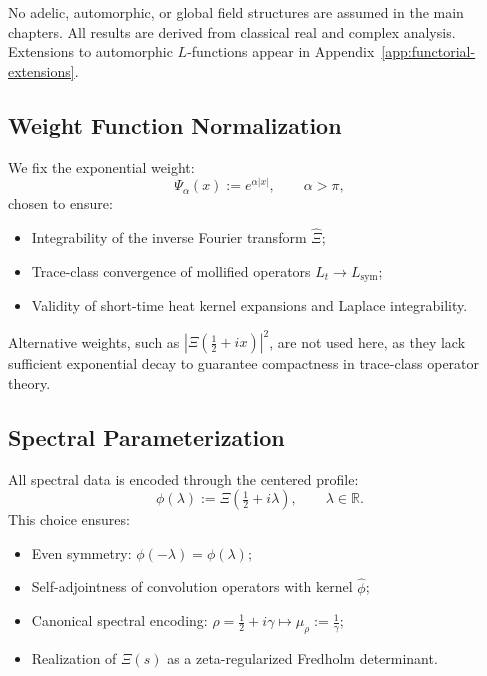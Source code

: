 No adelic, automorphic, or global field structures are assumed in the main chapters. All results are derived from classical real and complex analysis. Extensions to automorphic \( L \)-functions appear in Appendix~\ref{app:functorial-extensions}.

\subsection*{Weight Function Normalization}

We fix the exponential weight:
\[
\Psi_\alpha(x) := e^{\alpha |x|}, \qquad \alpha > \pi,
\]
chosen to ensure:
\begin{itemize}
  \item Integrability of the inverse Fourier transform \( \widehat{\Xi} \);
  \item Trace-class convergence of mollified operators \( L_t \to L_{\mathrm{sym}} \);
  \item Validity of short-time heat kernel expansions and Laplace integrability.
\end{itemize}

Alternative weights, such as \( |\Xi(\tfrac{1}{2} + ix)|^2 \), are not used here, as they lack sufficient exponential decay to guarantee compactness in trace-class operator theory.

\subsection*{Spectral Parameterization}

All spectral data is encoded through the centered profile:
\[
\phi(\lambda) := \Xi\left( \tfrac{1}{2} + i\lambda \right), \qquad \lambda \in \mathbb{R}.
\]
This choice ensures:
\begin{itemize}
  \item Even symmetry: \( \phi(-\lambda) = \phi(\lambda) \);
  \item Self-adjointness of convolution operators with kernel \( \widehat{\phi} \);
  \item Canonical spectral encoding: \( \rho = \tfrac{1}{2} + i\gamma \mapsto \mu_\rho := \frac{1}{\gamma} \);
  \item Realization of \( \Xi(s) \) as a zeta-regularized Fredholm determinant.
\end{itemize}
